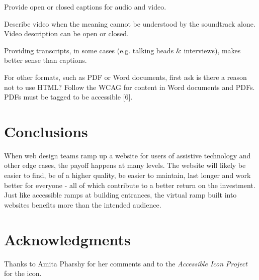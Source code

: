 \documentclass{acm_proc_article-sp}
\begin{document}
Provide open or closed captions for audio and video.

Describe video when the meaning cannot be understood by the soundtrack alone. Video description can be open or closed.

Providing transcripts, in some cases (e.g. talking heads \& interviews), makes better sense than captions.

For other formats, such as PDF or Word documents, first ask is there a reason not to use HTML? Follow the WCAG for content in Word documents and PDFs. PDFs must be tagged to be accessible [6].

\section{Conclusions}
When web design teams ramp up a website for users of assistive technology and other edge cases, the payoff happens at many levels. The website will likely be easier to find, be of a higher quality, be easier to maintain, last longer and work better for everyone - all of which contribute to a better return on the investment. Just like accessible ramps at building entrances, the virtual ramp built into websites benefits more than the intended audience.

\section{Acknowledgments}
Thanks to Amita Pharshy for her comments and to the {\it Accessible Icon Project} for the icon.

\end{document}
